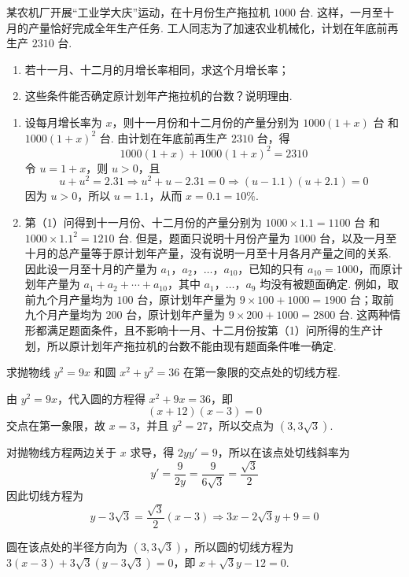 \begin{problem}
某农机厂开展“工业学大庆”运动，在十月份生产拖拉机 \( 1000\text{ 台}\). 这样，一月至十月的产量恰好完成全年生产任务. 工人同志为了加速农业机械化，计划在年底前再生产 \( 2310\text{ 台}\).

\begin{enumerate}
    \item 若十一月、十二月的月增长率相同，求这个月增长率；
    \item 这些条件能否确定原计划年产拖拉机的台数？说明理由.
\end{enumerate}
\end{problem}

\begin{solution}
\begin{enumerate}
    \item 设每月增长率为 \(x\)，则十一月份和十二月份的产量分别为 \( 1000\left(1+x\right)\text{ 台}\) 和 \( 1000\left(1+x\right)^2\text{ 台}\). 由计划在年底前再生产 \( 2310\text{ 台}\)，得
    \[
    1000\left(1+x\right)+1000\left(1+x\right)^2=2310
    \]
    令 \(u=1+x\)，则 \(u>0\)，且
    \[
    u+u^2=2.31\Longrightarrow u^2+u-2.31=0\Longrightarrow \left(u-1.1\right)\left(u+2.1\right)=0
    \]
    因为 \(u>0\)，所以 \(u=1.1\)，从而 \(x=0.1=10\%\).

    \item 第（1）问得到十一月份、十二月份的产量分别为 \(1000\times1.1=1100\text{ 台}\) 和 \(1000\times1.1^2=1210\text{ 台}\). 但是，题面只说明十月份产量为 \(1000\text{ 台}\)，以及一月至十月的总产量等于原计划年产量，没有说明一月至十月各月产量之间的关系. 因此设一月至十月的产量为 \(a_1\)，\(a_2\)，\(\ldots\)，\(a_{10}\)，已知的只有 \(a_{10}=1000\)，而原计划年产量为 \(a_1+a_2+\cdots+a_{10}\)，其中 \(a_1\)，\(\ldots\)，\(a_9\) 均没有被题面确定. 例如，取前九个月产量均为 \(100\text{ 台}\)，原计划年产量为 \(9\times100+1000=1900\text{ 台}\)；取前九个月产量均为 \(200\text{ 台}\)，原计划年产量为 \(9\times200+1000=2800\text{ 台}\). 这两种情形都满足题面条件，且不影响十一月、十二月份按第（1）问所得的生产计划，所以原计划年产拖拉机的台数不能由现有题面条件唯一确定.
\end{enumerate}
\end{solution}

\begin{problem}
求抛物线 \( y^2=9x \) 和圆 \( x^2+y^2=36 \) 在第一象限的交点处的切线方程.
\end{problem}

\begin{solution}
由 \(y^2=9x\)，代入圆的方程得 \(x^2+9x=36\)，即
\[
    \left(x+12\right)\left(x-3\right)=0
\]
交点在第一象限，故 \(x=3\)，并且 \(y^2=27\)，所以交点为 \( \left(3,3\sqrt3\right)\).

对抛物线方程两边关于 \(x\) 求导，得 \( 2yy'=9\)，所以在该点处切线斜率为
\[
y'=\frac{9}{2y}=\frac{9}{6\sqrt3}=\frac{\sqrt3}{2}
\]
因此切线方程为
\[
    y-3\sqrt3=\frac{\sqrt3}{2}\left(x-3\right)\Longrightarrow 3x-2\sqrt3y+9=0
\]

圆在该点处的半径方向为 \((3,3\sqrt3)\)，所以圆的切线方程为 \(3(x-3)+3\sqrt3(y-3\sqrt3)=0\)，即 \(x+\sqrt3y-12=0\).
\end{solution}

